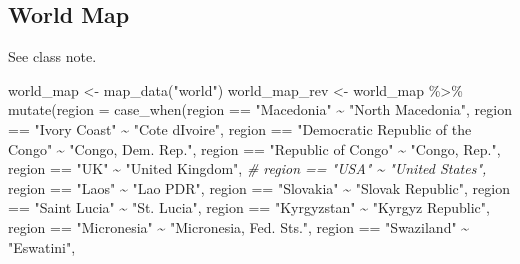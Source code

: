 \documentclass[
]{article}
\newenvironment{Shaded}{\begin{snugshade}}{\end{snugshade}}
\newcommand{\AttributeTok}[1]{\textcolor[rgb]{0.77,0.63,0.00}{#1}}
\newcommand{\CommentTok}[1]{\textcolor[rgb]{0.56,0.35,0.01}{\textit{#1}}}
\newcommand{\FunctionTok}[1]{\textcolor[rgb]{0.00,0.00,0.00}{#1}}
\newcommand{\NormalTok}[1]{#1}
\newcommand{\OtherTok}[1]{\textcolor[rgb]{0.56,0.35,0.01}{#1}}
\newcommand{\SpecialCharTok}[1]{\textcolor[rgb]{0.00,0.00,0.00}{#1}}
\newcommand{\StringTok}[1]{\textcolor[rgb]{0.31,0.60,0.02}{#1}}
\begin{document}
\hypertarget{world-map}{%
\subsection{World Map}\label{world-map}}

See class note.

\begin{Shaded}
\begin{Highlighting}[]
\NormalTok{world\_map }\OtherTok{\textless{}{-}} \FunctionTok{map\_data}\NormalTok{(}\StringTok{"world"}\NormalTok{)}
\NormalTok{world\_map\_rev }\OtherTok{\textless{}{-}}\NormalTok{ world\_map }\SpecialCharTok{\%\textgreater{}\%} 
  \FunctionTok{mutate}\NormalTok{(}\AttributeTok{region =} \FunctionTok{case\_when}\NormalTok{(region }\SpecialCharTok{==} \StringTok{"Macedonia"} \SpecialCharTok{\textasciitilde{}} \StringTok{"North Macedonia"}\NormalTok{,}
\NormalTok{                            region }\SpecialCharTok{==} \StringTok{"Ivory Coast"}  \SpecialCharTok{\textasciitilde{}} \StringTok{"Cote d\textquotesingle{}Ivoire"}\NormalTok{,}
\NormalTok{                            region }\SpecialCharTok{==} \StringTok{"Democratic Republic of the Congo"}  \SpecialCharTok{\textasciitilde{}} \StringTok{"Congo, Dem. Rep."}\NormalTok{,}
\NormalTok{                            region }\SpecialCharTok{==} \StringTok{"Republic of Congo"} \SpecialCharTok{\textasciitilde{}}  \StringTok{"Congo, Rep."}\NormalTok{,}
\NormalTok{                            region }\SpecialCharTok{==} \StringTok{"UK"} \SpecialCharTok{\textasciitilde{}}  \StringTok{"United Kingdom"}\NormalTok{,}
\CommentTok{\#                            region == "USA" \textasciitilde{}  "United States",}
\NormalTok{                            region }\SpecialCharTok{==} \StringTok{"Laos"} \SpecialCharTok{\textasciitilde{}}  \StringTok{"Lao PDR"}\NormalTok{,}
\NormalTok{                            region }\SpecialCharTok{==} \StringTok{"Slovakia"} \SpecialCharTok{\textasciitilde{}}  \StringTok{"Slovak Republic"}\NormalTok{,}
\NormalTok{                            region }\SpecialCharTok{==} \StringTok{"Saint Lucia"} \SpecialCharTok{\textasciitilde{}}  \StringTok{"St. Lucia"}\NormalTok{,}
\NormalTok{                            region }\SpecialCharTok{==} \StringTok{"Kyrgyzstan"}  \SpecialCharTok{\textasciitilde{}}  \StringTok{"Kyrgyz Republic"}\NormalTok{,}
\NormalTok{                            region }\SpecialCharTok{==} \StringTok{"Micronesia"} \SpecialCharTok{\textasciitilde{}} \StringTok{"Micronesia, Fed. Sts."}\NormalTok{,}
\NormalTok{                            region }\SpecialCharTok{==} \StringTok{"Swaziland"}  \SpecialCharTok{\textasciitilde{}} \StringTok{"Eswatini"}\NormalTok{, }

\end{Highlighting}
\end{Shaded}
\end{document}
